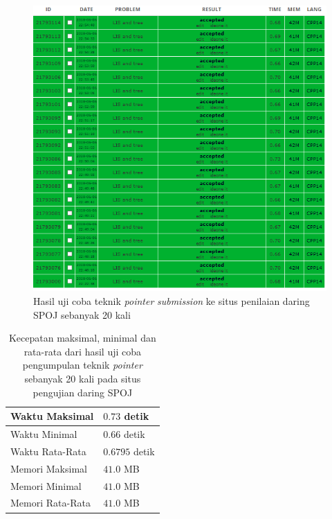 \documentclass[a4paper]{IEEEtran}
\begin{document}
\begin{figure}[H]
	\centering
	\includegraphics[width=\linewidth]{images/20accP.PNG}
	\caption{Hasil uji coba teknik \textit{pointer} \textit{submission} ke situs penilaian daring SPOJ sebanyak 20 kali}
	\label{figure:chart2}
\end{figure}
\begin{table}[H]
	\centering
	\begin{tabular}{|l|l|} \hline
		Waktu Maksimal & $ 0.73 $ detik\\ \hline
		Waktu Minimal & $ 0.66 $ detik\\ \hline
		Waktu Rata-Rata & $ 0.6795 $ detik\\ \hline
		Memori Maksimal & $ 41.0 $ MB\\ \hline
		Memori Minimal & $ 41.0 $ MB\\ \hline
		Memori Rata-Rata & $ 41.0 $ MB\\ \hline
	\end{tabular}
	\caption{Kecepatan maksimal, minimal dan rata-rata dari hasil uji coba pengumpulan teknik \textit{pointer} sebanyak 20 kali pada situs pengujian daring SPOJ}
	\label{tab:statistik2}
\end{table}
\end{document}
